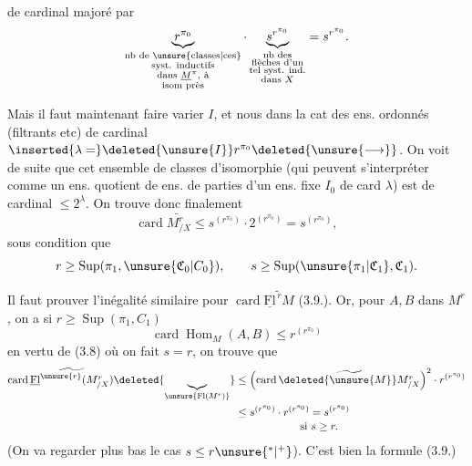 
de cardinal majoré par
\[
\underbrace{r^{\pi_0}}_{\substack{\text{nb de \unsure{classes|ces}}\\\text{syst. inductifs}\\\text{dans }\underline M^{\pi},\text{ à}\\\text{isom près}}}
\mathbin{\cdot}
\underbrace{s^{r^{\pi_0}}}_{\substack{\text{nb des}\\\text{flèches d'un}\\\text{tel syst. ind.}\\\text{dans }X}}
= s^{r^{\pi_0}}.
\]

Mais il faut maintenant faire varier $I$,
et nous  dans la cat des ens. ordonnés
(filtrants etc) de cardinal $\inserted{\lambda=}\deleted{\unsure{I}}r^{\pi_0}\deleted{\unsure{\longrightarrow}}$.
On voit de suite que cet ensemble de classes d'isomorphie (qui peuvent s'interpréter comme un ens.
quotient de   ens. de parties d'un ens.
fixe $I_0$ de card $\lambda$) est de cardinal $\leq 2^\lambda$.
On trouve donc finalement
\[
\operatorname{card}\widetilde{M^r_{/X}}\leq s^{(r^{\pi_0})}\mathbin{\cdot}2^{(r^{\pi_0})}=s^{(r^{\pi_0})},
\]
sous condition que
\[
r\geq\operatorname{Sup}(\pi_1,\unsure{\mathfrak C_0|C_0}),\qquad s\geq\operatorname{Sup}(\unsure{\pi_1|\mathfrak C_1},\mathfrak C_1).
\]

Il faut prouver l'inégalité similaire pour
$\operatorname{card}\widetilde{\underline{\mathrm{Fl}}^{\,r}M}$ (3.9.). Or,  
pour  $A,B$ dans $M^r$, on a si $r\geq\operatorname{Sup}(\pi_1,C_1)$
\[
\operatorname{card}\operatorname{Hom}_{M}(A,B)\leq r^{(r^{\pi_0})}
\]
en vertu de (3.8) où on fait $s=r$, on trouve que
\[
\begin{aligned}
\operatorname{card}\widetilde{\underline{\mathrm{Fl}}^{\unsure{r}}(M^r_{/X})}
\deleted{\underbrace{\vphantom{\mathrm{Fl}}}_{\unsure{\mathrm{Fl}(M^r)}}}
&\leq\left(\operatorname{card}\widetilde{\deleted{\unsure{M}}M^r_{/X}}\right)^2\mathbin{\cdot}r^{(r^{\pi_0})}\\
&\leq s^{(r^{\pi_0})}\mathbin{\cdot}r^{(r^{\pi_0})}=s^{(r^{\pi_0})}\\[-2pt]
&\hspace{6em}\text{si }s\geq r.
\end{aligned}
\]
(On va regarder plus bas le cas $s\leq r\unsure{{}^{*}|{}^{+}}$). C'est bien
la formule (3.9.)

